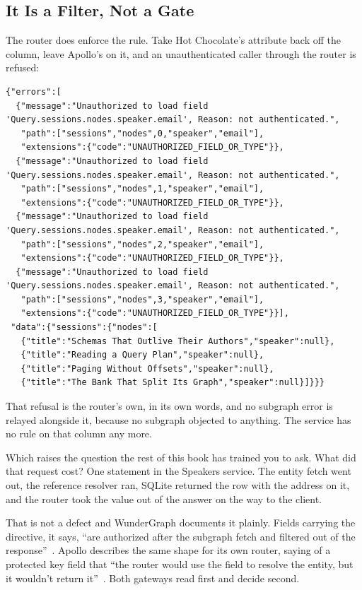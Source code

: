 \subsection{It Is a Filter, Not a Gate}

%
The router does enforce the rule. Take Hot Chocolate's attribute back off the
column, leave Apollo's on it, and an unauthenticated caller through the
router is refused:

\begin{verbatim}
{"errors":[
  {"message":"Unauthorized to load field 'Query.sessions.nodes.speaker.email', Reason: not authenticated.",
   "path":["sessions","nodes",0,"speaker","email"],
   "extensions":{"code":"UNAUTHORIZED_FIELD_OR_TYPE"}},
  {"message":"Unauthorized to load field 'Query.sessions.nodes.speaker.email', Reason: not authenticated.",
   "path":["sessions","nodes",1,"speaker","email"],
   "extensions":{"code":"UNAUTHORIZED_FIELD_OR_TYPE"}},
  {"message":"Unauthorized to load field 'Query.sessions.nodes.speaker.email', Reason: not authenticated.",
   "path":["sessions","nodes",2,"speaker","email"],
   "extensions":{"code":"UNAUTHORIZED_FIELD_OR_TYPE"}},
  {"message":"Unauthorized to load field 'Query.sessions.nodes.speaker.email', Reason: not authenticated.",
   "path":["sessions","nodes",3,"speaker","email"],
   "extensions":{"code":"UNAUTHORIZED_FIELD_OR_TYPE"}}],
 "data":{"sessions":{"nodes":[
   {"title":"Schemas That Outlive Their Authors","speaker":null},
   {"title":"Reading a Query Plan","speaker":null},
   {"title":"Paging Without Offsets","speaker":null},
   {"title":"The Bank That Split Its Graph","speaker":null}]}}}
\end{verbatim}

%
That refusal is the router's own, in its own words, and no subgraph error is
relayed alongside it, because no subgraph objected to anything. The service
has no rule on that column any more.

%
Which raises the question the rest of this book has trained you to ask. What
did that request cost? One statement in the Speakers service. The
entity fetch went out, the reference resolver ran, SQLite returned the row
with the address on it, and the router took the value out of the answer on
the way to the client.

%
That is not a defect and WunderGraph documents it plainly. Fields carrying
the directive, it says, \enquote{are authorized after the subgraph fetch and
filtered out of the response}~\autocite{cosmoauthentication}. Apollo describes
the same shape for its own router, saying of a protected key field that
\enquote{the router would use the  field to resolve the
 entity, but it wouldn't return
it}~\autocite{apolloauthorization}. Both gateways read first and decide
second.

